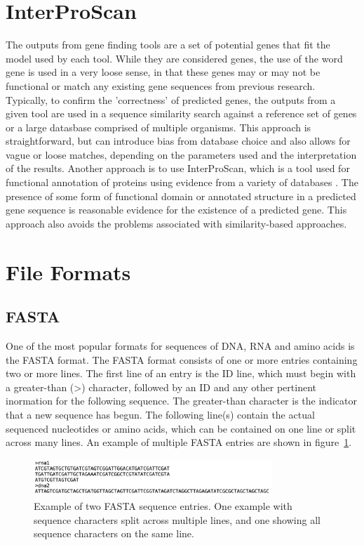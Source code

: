 \section{InterProScan}
The outputs from gene finding tools are a set of potential genes that
fit the model used by each tool. While they are considered genes, the
use of the word gene is used in a very loose sense, in that these
genes may or may not be functional or match any existing gene
sequences from previous research. Typically, to confirm the
'correctness' of predicted genes, the outputs from a given tool are
used in a sequence similarity search against a reference set of genes
or a large datasbase comprised of multiple organisms. This approach is
straightforward, but can introduce bias from database choice and also
allows for vague or loose matches, depending on the parameters used
and the interpretation of the results. Another approach is to use
InterProScan, which is a tool used for functional annotation of
proteins using evidence from a variety of databases
\cite{10.1093/nar/gkac993}. The presence of some form of functional
domain or annotated structure in a predicted gene sequence is
reasonable evidence for the existence of a predicted gene. This
approach also avoids the problems associated with similarity-based
approaches.


\section{File Formats}

\subsection{FASTA}
One of the most popular formats for sequences of DNA, RNA and amino
acids is the FASTA format. The FASTA format consists of one or more
entries containing two or more lines. The first line of an entry is
the ID line, which must begin with a greater-than (\textgreater)
character, followed by an ID and any other pertinent inormation for
the following sequence. The greater-than character is the indicator
that a new sequence has begun. The following line(s) contain the
actual sequenced nucleotides or amino acids, which can be contained on
one line or split across many lines. An example of multiple FASTA
entries are shown in figure~\ref{fig:fasta-example}.

\begin{figure}
  \centering
  \includegraphics[width=0.8\textwidth]{figures/fasta-example.png}
  \caption{Example of two FASTA sequence entries. One example with
    sequence characters split across multiple lines, and one showing
    all sequence characters on the same line.}
  \label{fig:fasta-example}
\end{figure}

